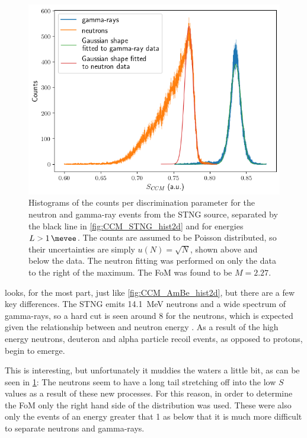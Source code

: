 \documentclass[11pt]{article}
\numberwithin{equation}{section}
\numberwithin{figure}{section}
\numberwithin{table}{section}
\begin{document}
\begin{figure}[H]
    \begin{center}
        \includegraphics[scale=0.75]{Plots/CCM_STNG_separation_hist.png}
        \caption{Histograms of the counts per discrimination parameter for the neutron and gamma-ray events from the STNG source, separated by the black line in \cref{fig:CCM_STNG_hist2d} and for energies $L>\SI{1}{\mevee}$. The counts are assumed to be Poisson distributed, so their uncertainties are simply $u(N)=\sqrt{N}$, shown above and below the data. The neutron fitting was performed on only the data to the right of the maximum. The FoM was found to be $M=2.27$.}
        \label{fig:CCM_STNG_separation_hist}
    \end{center}
\end{figure}
\par {} looks, for the most part, just like \cref{fig:CCM_AmBe_hist2d}, but there are a few key differences. The STNG emits \SI{14.1}{\mega\electronvolt} neutrons and a wide spectrum of gamma-rays, so a hard cut is seen around \SI{8}{\mevee} for the neutrons, which is expected given the relationship between \unit{\mevee} and neutron energy \cite{Mevee}. As a result of the high energy neutrons, deuteron and alpha particle recoil events, as opposed to protons, begin to emerge. 
\par This is interesting, but unfortunately it muddies the waters a little bit, as can be seen in \cref{fig:CCM_STNG_separation_hist}: The neutrons seem to have a long tail stretching off into the low $S$ values as a result of these new processes. For this reason, in order to determine the FoM only the right hand side of the distribution was used. These were also only the events of an energy greater that \SI{1}{\mevee} as below that it is much more difficult to separate neutrons and gamma-rays. 
\end{document}
